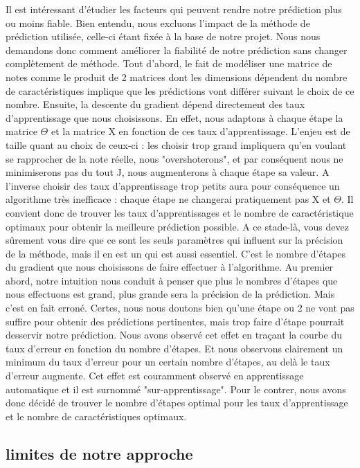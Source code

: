 \documentclass[a4paper,10pt]{article}
\begin{document}
Il est intéressant d'étudier les facteurs qui peuvent rendre notre prédiction plus ou moins fiable. Bien entendu, nous excluons l'impact de la méthode de prédiction utilisée, celle-ci étant fixée à la base de notre projet. Nous nous demandons donc comment améliorer la fiabilité de notre prédiction sans changer complètement de méthode. Tout d'abord, le fait de modéliser une matrice de notes comme le produit de 2 matrices dont les dimensions dépendent du nombre de caractéristiques implique que les prédictions vont différer suivant le choix de ce nombre. Ensuite, la descente du gradient dépend directement des taux d'apprentissage que nous choisissons. En effet, nous adaptons à chaque étape la matrice $\Theta$ et la matrice X en fonction de ces taux d'apprentissage. L'enjeu est de taille quant au choix de ceux-ci : les choisir trop grand impliquera qu'en voulant se rapprocher de la note réelle, nous "overshoterons", et par conséquent nous ne minimiserons pas du tout J, nous augmenterons à chaque étape sa valeur. A l'inverse choisir des taux d'apprentissage trop petits aura pour conséquence un algorithme très inefficace : chaque étape ne changerai pratiquement pas X et $\Theta$. Il convient donc de trouver les taux d'apprentissages et le nombre de caractéristique optimaux pour obtenir la meilleure prédiction possible. A ce stade-là, vous devez sûrement vous dire que ce sont les seuls paramètres qui influent sur la précision de la méthode, mais il en est un qui est aussi essentiel. C'est le nombre d'étapes du gradient que nous choisissons de faire effectuer à l'algorithme. Au premier abord, notre intuition nous conduit à penser que plus le nombres d'étapes que nous effectuons est grand, plus grande sera la précision de la prédiction. Mais c'est en fait erroné. Certes, nous nous doutons bien qu'une étape ou 2 ne vont pas suffire pour obtenir des prédictions pertinentes, mais trop faire d'étape pourrait desservir notre prédiction. Nous avons observé cet effet en traçant la courbe du taux d'erreur en fonction du nombre d'étapes. Et nous observons clairement un minimum du taux d'erreur pour un certain nombre d'étapes, au delà le taux d'erreur augmente. Cet effet est couramment observé en apprentissage automatique et il est surnommé "sur-apprentissage". Pour le contrer, nous avons donc décidé de trouver le nombre d'étapes optimal pour les taux d'apprentissage et le nombre de caractéristiques optimaux.

\subsection{limites de notre approche} 
\end{document}
